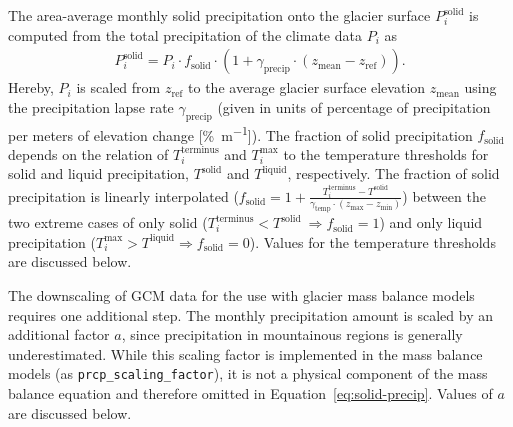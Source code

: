         The area-average monthly solid precipitation onto the glacier surface $P_i^\text{solid}$ is computed from the total precipitation of the climate data $P_i$ as
        \begin{align}\label{eq:solid-precip}
            P_i^\text{solid} = P_i \cdot f_\text{solid} \cdot (1 + \gamma_\text{precip} \cdot (z_\text{mean} - z_\text{ref})).
        \end{align}
        Hereby, $P_i$ is scaled from $z_\text{ref}$ to the average glacier surface elevation $z_\text{mean}$ using the precipitation lapse rate $\gamma_\text{precip}$ (given in units of percentage of precipitation per meters of elevation change [\si{\percent\per\meter}]). The fraction of solid precipitation $f_\text{solid}$ depends on the 
        relation of $T_i^\text{terminus}$ and $T_{i}^\text{max}$ to the temperature thresholds for solid and liquid precipitation, $T^\text{solid}$ and $T^\text{liquid}$, respectively. The fraction of solid precipitation is linearly interpolated ($f_\text{solid} = 1 + \frac{T_{i}^\text{terminus} - T^\text{solid}}{\gamma_\text{temp}\cdot(z_\text{max} - z_\text{min})}$) between the two extreme cases of only solid ($T_i^\text{terminus} < T^\text{solid} \ \Rightarrow f_\text{solid} = 1$) and only liquid precipitation ($T_i^\text{max} > T^\text{liquid} \Rightarrow f_\text{solid} = 0$). Values for the temperature thresholds are discussed below.

        
        The downscaling of GCM data for the use with glacier mass balance models requires one additional step. The monthly precipitation amount is scaled by an additional factor $a$, since precipitation in mountainous regions is generally underestimated. While this scaling factor is implemented in the mass balance models (as \lstinline`prcp_scaling_factor`), it is not a physical component of the  mass balance equation and therefore omitted in Equation~\ref{eq:solid-precip}. Values of $a$ are discussed below.

